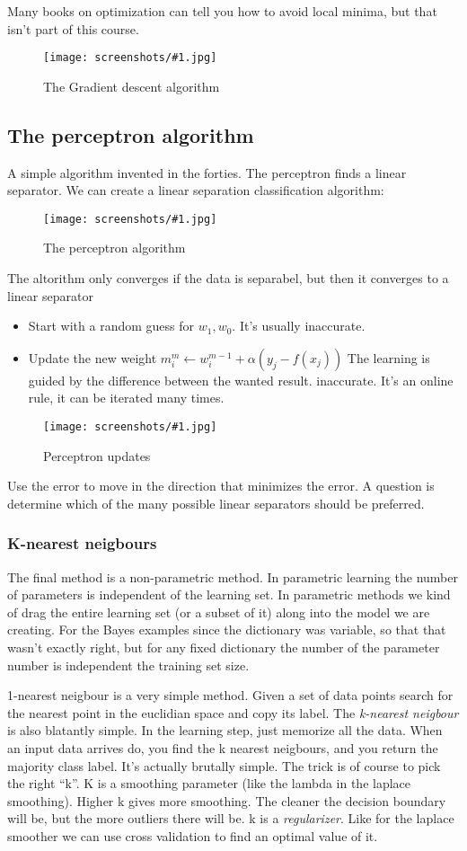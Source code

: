 \documentclass[a4, 12pt, english, USenglish]{scrreprt}
\newcommand{\screenshot}[2]{
\begin{figure}[htb]
\texttt{[image: screenshots/\#1.jpg]}
\label{#1}
\caption{#2}
\end{figure}}
\newcommand{\parens}[1]{\ensuremath{\left({#1}\right)}}
\newcommand{\idx}[1]{{\em #1}\index{#1}}
\begin{document}
Many books on optimization can tell you how to avoid local minima, but
that isn't part of this course.

\screenshot{graddescentalgorithm}{The Gradient descent algorithm}

\subsection{The perceptron algorithm}

A simple algorithm invented in the forties.  The perceptron finds a
linear separator.  We can create a linear separation classification
algorithm:

\screenshot{perceptronalorithm}{The perceptron algorithm}

The altorithm only converges if the data is separabel, but then it
converges to a linear separator

\begin{itemize}

\item Start with a random guess for \(w_1, w_0\).  It's usually
    inaccurate.

\item Update the new weight \(m_i^m \leftarrow w_i^{m-1} +\alpha\parens{y_j - f(x_j)}\)
The learning is guided by the difference between the wanted result.
    inaccurate. It's an online rule, it can be iterated many times.

\end{itemize}

\screenshot{perceptronupdate}{Perceptron updates}

Use the error to move in the direction that minimizes the error.    A
question is determine which of the many possible linear separators
should be preferred.

\subsubsection{K-nearest neigbours}

The final method is a non-parametric method.  In parametric learning
the number of parameters is independent of the learning set.  In
parametric methods we kind of drag the entire learning set (or a
subset of it) along into the model we are creating.  For the Bayes
examples since the dictionary was variable, so that that wasn't exactly right, but for any fixed dictionary the
number of the parameter number is independent the training set size.

1-nearest neigbour is a very simple method.  Given a set of data
points search for the nearest point in the euclidian space and copy
its label.  The \idx{k-nearest neigbour} is also blatantly simple.  In
the learning step, just memorize all the data.   When an input data
arrives do, you find the k nearest neigbours, and you return the
majority class label.  It's actually brutally simple.  The trick is of
course to pick the right ``k''.    K is a smoothing parameter (like
the lambda in the laplace smoothing).   Higher k gives more
smoothing.   The cleaner the decision boundary will be, but the more
outliers there will be.  k is a \idx{regularizer}.  Like for the
laplace smoother we can use cross validation to find an optimal value
of it.
\end{document}
